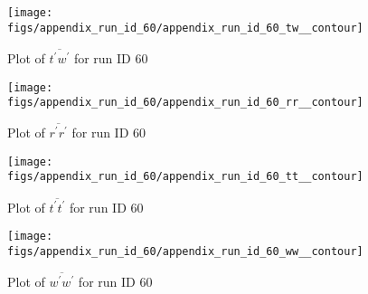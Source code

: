 \begin{figure}[H]
\centering
\texttt{[image: figs/appendix\_run\_id\_60/appendix\_run\_id\_60\_tw\_\_contour]}
\caption{Plot of $\overline{t^\prime w^\prime}$ for run ID 60}
\label{fig:appendix_run_id_60_tw__contour}
\end{figure}


\begin{figure}[H]
\centering
\texttt{[image: figs/appendix\_run\_id\_60/appendix\_run\_id\_60\_rr\_\_contour]}
\caption{Plot of $\overline{r^\prime r^\prime}$ for run ID 60}
\label{fig:appendix_run_id_60_rr__contour}
\end{figure}


\begin{figure}[H]
\centering
\texttt{[image: figs/appendix\_run\_id\_60/appendix\_run\_id\_60\_tt\_\_contour]}
\caption{Plot of $\overline{t^\prime t^\prime}$ for run ID 60}
\label{fig:appendix_run_id_60_tt__contour}
\end{figure}


\begin{figure}[H]
\centering
\texttt{[image: figs/appendix\_run\_id\_60/appendix\_run\_id\_60\_ww\_\_contour]}
\caption{Plot of $\overline{w^\prime w^\prime}$ for run ID 60}
\label{fig:appendix_run_id_60_ww__contour}
\end{figure}


